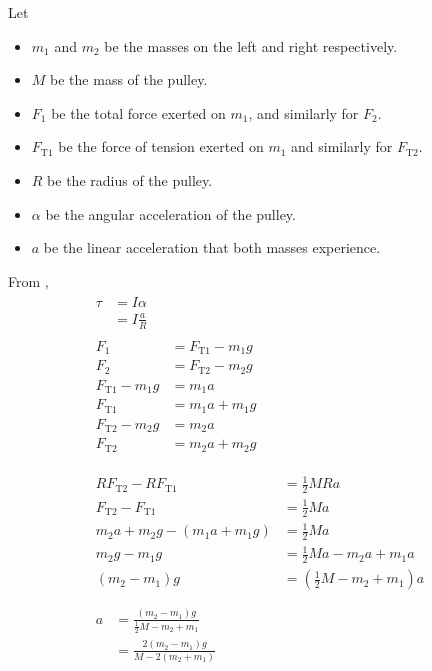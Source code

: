 \documentclass[a4paper, titlepage]{book}
\begin{document}
Let
\begin{itemize}
    \item
        \(m_1\) and \(m_2\) be
        the masses on the left and right respectively.
    \item \(M\) be the mass of the pulley.
    \item
        \(F_1\) be the total force exerted on \(m_1\),
        and similarly for \(F_2\).
    \item
        \(F_\mathrm{T1}\) be the force of tension exerted on \(m_1\)
        and similarly for \(F_\mathrm{T2}\).
    \item \(R\) be the radius of the pulley.
    \item \(\alpha\) be the angular acceleration of the pulley.
    \item \(a\) be the linear acceleration that both masses experience.
\end{itemize}

From ,
\begin{equation}
    \begin{gathered}
        \begin{aligned}
            \tau &= I \alpha \\
            &= I \frac{a}{R}
        \end{aligned} \\
        \begin{aligned}
            F_1 &= F_\mathrm{T1} - m_1 g \\
            F_2 &= F_\mathrm{T2} - m_2 g \\
            F_\mathrm{T1} - m_1 g &= m_1 a \\
            F_\mathrm{T1} &= m_1 a + m_1 g \\
            F_\mathrm{T2} - m_2 g &= m_2 a \\
            F_\mathrm{T2} &= m_2 a + m_2 g \\
        \end{aligned} \\
        \\
        \begin{aligned}
            R F_\mathrm{T2} - R F_\mathrm{T1} &= \frac{1}{2} MR a \\
            F_\mathrm{T2} - F_\mathrm{T1} &= \frac{1}{2} M a \\
            m_2 a + m_2 g - \left( m_1 a + m_1 g \right) &= \frac{1}{2} M a \\
            m_2 g - m_1 g &= \frac{1}{2} M a - m_2 a + m_1 a \\
            \left( m_2 - m_1 \right) g &= \left( \frac{1}{2} M - m_2 + m_1 \right) a \\
        \end{aligned} \\
        \begin{aligned}
            a &= \frac{\left( m_2 - m_1 \right) g}{\frac{1}{2} M - m_2 + m_1} \\
            &= \frac{2 \left( m_2 - m_1 \right) g}{M - 2 \left( m_2 + m_1 \right)}
        \end{aligned}
    \end{gathered}
\end{equation}
\end{document}
